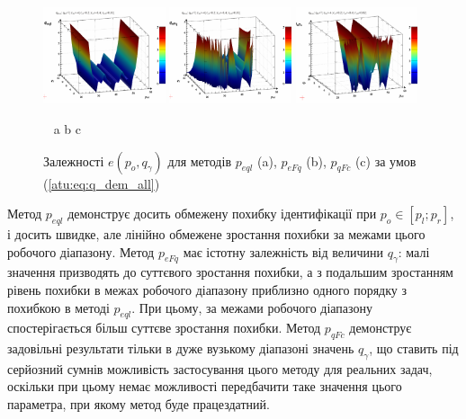 \begin{figure}[htb!]
  \begin{center}
    \includegraphics[width=0.32\textwidth]{p/qls_pe-p_po_qg_eql_all.png}
    \hfill
    \includegraphics[width=0.32\textwidth]{p/qls_pe-p_po_qg_eFq_all.png}
    \hfill
    \includegraphics[width=0.32\textwidth]{p/qls_pe-p_po_qg_eFc_all.png}
  \end{center}
  \vspace{-1.0ex}
  \begin{center}
    ~ \hfill a \hfill\hfill b \hfill\hfill c \hfill ~
  \end{center}
  \vspace{-1.5ex}
  \caption{Залежності $e(p_o,q_\gamma)$ для методів $p_{eql}$ (a), $p_{eFq}$ (b), $p_{qFc}$ (c) за умов (\ref{atu:eq:q_dem_all})}
  \label{atu:f:qsl_pe_po_qg_all}
\end{figure}

Метод $p_{eql}$ демонструє досить обмежену похибку ідентифікації при
$p_o \in [p_l; p_r]$, і досить швидке, але лінійно обмежене зростання похибки за
межами цього робочого діапазону. Метод $p_{eFq}$ має істотну залежність
від величини $q_\gamma$: малі значення призводять до суттєвого
зростання похибки, а з подальшим зростанням рівень похибки в межах робочого
діапазону приблизно одного порядку з похибкою в методі $p_{eql}$. При
цьому, за межами робочого діапазону спостерігається більш суттєве зростання
похибки. Метод $p_{qFc}$ демонструє задовільні результати тільки в дуже
вузькому діапазоні значень $q_\gamma$, що ставить під серйозний сумнів
можливість застосування цього методу для реальних задач, оскільки при цьому
немає можливості передбачити таке значення цього параметра, при якому метод буде
працездатний.


